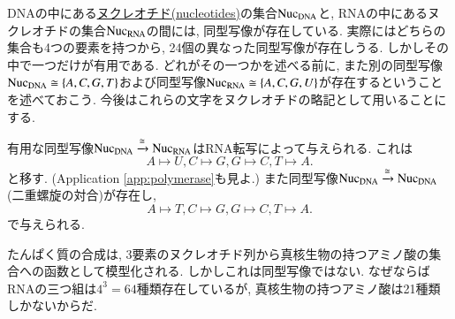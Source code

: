 \begin{application}\label{app:DNA RNA}


DNAの中にある\href{http://en.wikipedia.org/wiki/Nucleotides}{ヌクレオチド(nucleotides)}の集合$\textrm{Nuc}_\textrm{DNA}$と, RNAの中にあるヌクレオチドの集合$\textrm{Nuc}_\textrm{RNA}$の間には, 同型写像が存在している. 実際にはどちらの集合も4つの要素を持つから, 24個の異なった同型写像が存在しうる. しかしその中で一つだけが有用である. どれがその一つかを述べる前に, また別の同型写像$\textrm{Nuc}_\textrm{DNA}\cong\{A,C,G,T\}$および同型写像$\textrm{Nuc}_\textrm{RNA}\cong\{A,C,G,U\}$が存在するということを述べておこう. 今後はこれらの文字をヌクレオチドの略記として用いることにする.


有用な同型写像$\textrm{Nuc}_\textrm{DNA}\xrightarrow{\cong}\textrm{Nuc}_\textrm{RNA}$はRNA転写によって与えられる. これは
$$A\mapsto U, C\mapsto G, G\mapsto C, T\mapsto A.$$ 
と移す. (Application \ref{app:polymerase}も見よ.) また同型写像$\textrm{Nuc}_\textrm{DNA}\xrightarrow{\cong}\textrm{Nuc}_\textrm{DNA}$ (二重螺旋の対合)が存在し, 
$$A\mapsto T, C\mapsto G, G\mapsto C, T\mapsto A.$$
で与えられる.


たんぱく質の合成は, 3要素のヌクレオチド列から真核生物の持つアミノ酸の集合への函数として模型化される. しかしこれは同型写像ではない. なぜならばRNAの三つ組は$4^3=64$種類存在しているが, 真核生物の持つアミノ酸は21種類しかないからだ.

\end{application}

